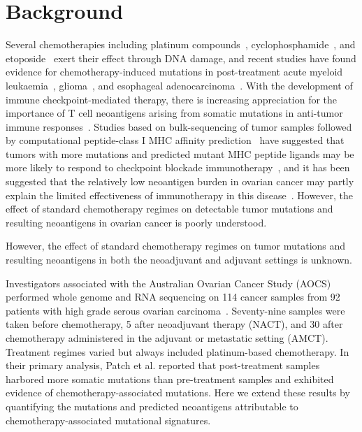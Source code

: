 \section*{Background}

Several chemotherapies including platinum compounds~\cite{Hannan_1989}, cyclophosphamide~\cite{Anderson_1995}, and etoposide~\cite{NAKANOMYO_1986} exert their effect through DNA damage, and recent studies have found evidence for chemotherapy-induced mutations in post-treatment acute myeloid leukaemia~\cite{Ding_2012}, glioma~\cite{Johnson_2013}, and esophageal adenocarcinoma~\cite{Murugaesu_2015}. With the development of immune checkpoint-mediated therapy\cite{Chen_2013}, there is increasing appreciation for the importance of T cell neoantigens arising from somatic mutations in anti-tumor immune responses~\cite{Schumacher_2015}. Studies based on bulk-sequencing of tumor samples followed by computational peptide-class I MHC affinity prediction~\cite{Lundegaard_2007} have suggested that tumors with more mutations and predicted mutant MHC peptide ligands may be more likely to respond to checkpoint blockade immunotherapy~\cite{Van_Allen_2015,Rizvi_2015}, and it has been suggested that the relatively low neoantigen burden in ovarian cancer may partly explain the limited effectiveness of immunotherapy in this disease~\cite{Martin_2016}. However, the effect of standard chemotherapy regimes on detectable tumor mutations and resulting neoantigens in ovarian cancer is poorly understood.

However, the effect of standard chemotherapy regimes on tumor mutations and resulting neoantigens in both the neoadjuvant and adjuvant settings is unknown.

Investigators associated with the Australian Ovarian Cancer Study (AOCS) performed whole genome and RNA sequencing on 114 cancer samples from 92 patients with high grade serous ovarian carcinoma~\cite{Patch_2015}. Seventy-nine samples were taken before chemotherapy, 5 after neoadjuvant therapy (NACT), and 30 after chemotherapy administered in the adjuvant or metastatic setting (AMCT). Treatment regimes varied but always included platinum-based chemotherapy. In their primary analysis, Patch et al. reported that post-treatment samples harbored more somatic mutations than pre-treatment samples and exhibited evidence of chemotherapy-associated mutations. Here we extend these results by quantifying the mutations and predicted neoantigens attributable to chemotherapy-associated mutational signatures.

